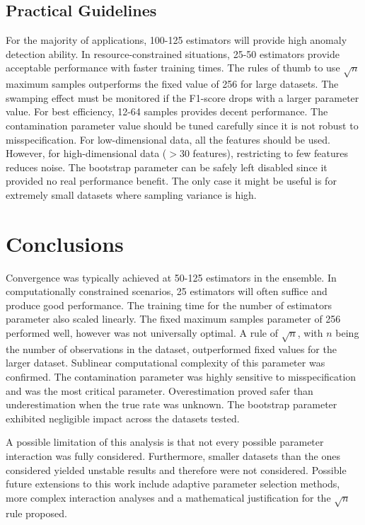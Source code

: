 \documentclass[10pt, conference]{IEEEtran}
\begin{document}
\subsection{Practical Guidelines}
For the majority of applications, 100-125 estimators will provide high anomaly detection ability. In resource-constrained situations, 25-50 estimators provide acceptable performance with faster training times. The rules of thumb to use $\sqrt{n}$ maximum samples outperforms the fixed value of 256 for large datasets. The swamping effect must be monitored if the F1-score drops with a larger parameter value. For best efficiency, 12-64 samples provides decent performance. The contamination parameter value should be tuned carefully since it is not robust to misspecification. For low-dimensional data, all the features should be used. However, for high-dimensional data ($> 30$ features), restricting to few features reduces noise. The bootstrap parameter can be safely left disabled since it provided no real performance benefit. The only case it might be useful is for extremely small datasets where sampling variance is high.

\section{Conclusions}
Convergence was typically achieved at 50-125 estimators in the ensemble. In computationally constrained scenarios, 25 estimators will often suffice and produce good performance. The training time for the number of estimators parameter also scaled linearly. The fixed maximum samples parameter of 256 performed well, however was not universally optimal. A rule of $\sqrt{n}$, with $n$ being the number of observations in the dataset, outperformed fixed values for the larger dataset. Sublinear computational complexity of this parameter was confirmed. The contamination parameter was highly sensitive to misspecification and was the most critical parameter. Overestimation proved safer than underestimation when the true rate was unknown. The bootstrap parameter exhibited negligible impact across the datasets tested.


A possible limitation of this analysis is that not every possible parameter interaction was fully considered. Furthermore, smaller datasets than the ones considered yielded unstable results and therefore were not considered.
Possible future extensions to this work include adaptive parameter selection methods, more complex interaction analyses and a mathematical justification for the $\sqrt{n}$ rule proposed.
\end{document}
